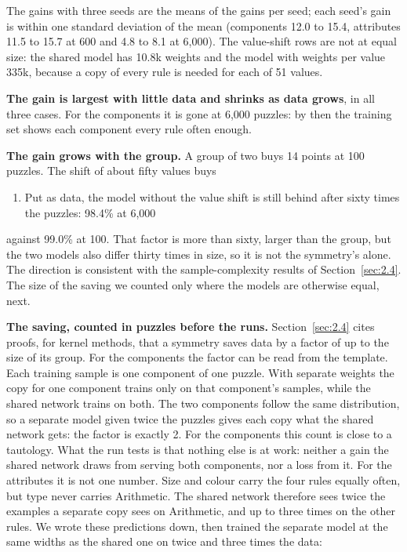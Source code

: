 The gains with three seeds are the means of the gains per seed; each seed's gain is within one standard deviation of the mean (components 12.0 to 15.4, attributes 11.5 to 15.7 at 600 and 4.8 to 8.1 at 6,000). The value-shift rows are not at equal size: the shared model has 10.8k weights and the model with weights per value 335k, because a copy of every rule is needed for each of 51 values.

\textbf{The gain is largest with little data and shrinks as data grows}, in all three cases. For the components it is gone at 6,000 puzzles: by then the training set shows each component every rule often enough.

\textbf{The gain grows with the group.} A group of two buys 14 points at 100 puzzles. The shift of about fifty values buys

\begin{enumerate}
\item Put as data, the model without the value shift is still behind after sixty times the puzzles: 98.4\% at 6,000
\end{enumerate}

against 99.0\% at 100. That factor is more than sixty, larger than the group, but the two models also differ thirty times in size, so it is not the symmetry's alone. The direction is consistent with the sample-complexity results of Section~\ref{sec:2.4}. The size of the saving we counted only where the models are otherwise equal, next.

\textbf{The saving, counted in puzzles before the runs.} Section~\ref{sec:2.4} cites proofs, for kernel methods, that a symmetry saves data by a factor of up to the size of its group. For the components the factor can be read from the template. Each training sample is one component of one puzzle. With separate weights the copy for one component trains only on that component's samples, while the shared network trains on both. The two components follow the same distribution, so a separate model given twice the puzzles gives each copy what the shared network gets: the factor is exactly 2. For the components this count is close to a tautology. What the run tests is that nothing else is at work: neither a gain the shared network draws from serving both components, nor a loss from it. For the attributes it is not one number. Size and colour carry the four rules equally often, but type never carries Arithmetic. The shared network therefore sees twice the examples a separate copy sees on Arithmetic, and up to three times on the other rules. We wrote these predictions down, then trained the separate model at the same widths as the shared one on twice and three times the data:

